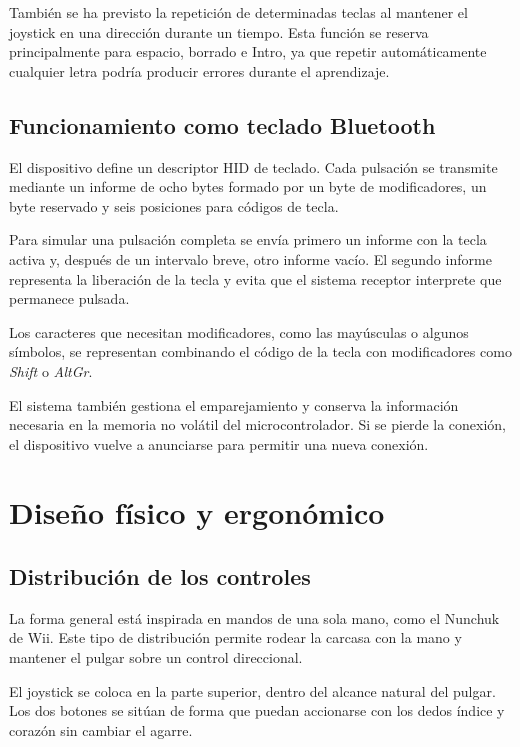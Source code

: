 También se ha previsto la repetición de determinadas teclas al mantener el joystick en una dirección durante un tiempo. Esta función se reserva principalmente para espacio, borrado e Intro, ya que repetir automáticamente cualquier letra podría producir errores durante el aprendizaje.

\subsection{Funcionamiento como teclado Bluetooth}
\label{subsec:funcionamiento-bluetooth}

El dispositivo define un descriptor HID de teclado. Cada pulsación se transmite mediante un informe de ocho bytes formado por un byte de modificadores, un byte reservado y seis posiciones para códigos de tecla.

Para simular una pulsación completa se envía primero un informe con la tecla activa y, después de un intervalo breve, otro informe vacío. El segundo informe representa la liberación de la tecla y evita que el sistema receptor interprete que permanece pulsada.

Los caracteres que necesitan modificadores, como las mayúsculas o algunos símbolos, se representan combinando el código de la tecla con modificadores como \textit{Shift} o \textit{AltGr}.

El sistema también gestiona el emparejamiento y conserva la información necesaria en la memoria no volátil del microcontrolador. Si se pierde la conexión, el dispositivo vuelve a anunciarse para permitir una nueva conexión.

\section{Diseño físico y ergonómico}
\label{sec:diseno-fisico}

\subsection{Distribución de los controles}
\label{subsec:distribucion-controles}

La forma general está inspirada en mandos de una sola mano, como el Nunchuk de Wii. Este tipo de distribución permite rodear la carcasa con la mano y mantener el pulgar sobre un control direccional.

El joystick se coloca en la parte superior, dentro del alcance natural del pulgar. Los dos botones se sitúan de forma que puedan accionarse con los dedos índice y corazón sin cambiar el agarre.

